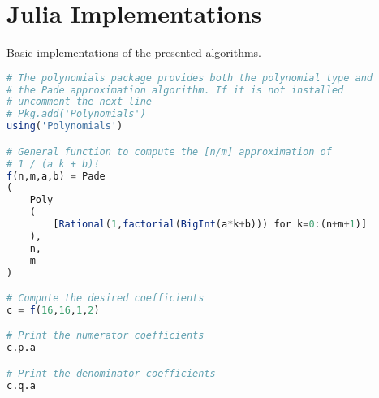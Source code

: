 \chapter{Julia Implementations}
Basic implementations of the presented algorithms.

\begin{lstlisting}[language=Julia,caption=Poor man's symbolic computation of the Pade coefficients of the generalized hyperbolic functions in Julia]
# The polynomials package provides both the polynomial type and
# the Pade approximation algorithm. If it is not installed 
# uncomment the next line
# Pkg.add('Polynomials')
using('Polynomials')

# General function to compute the [n/m] approximation of
# 1 / (a k + b)!
f(n,m,a,b) = Pade
(
	Poly
	(
		[Rational(1,factorial(BigInt(a*k+b))) for k=0:(n+m+1)]
	),
	n,
	m
)

# Compute the desired coefficients
c = f(16,16,1,2)

# Print the numerator coefficients
c.p.a

# Print the denominator coefficients
c.q.a
\end{lstlisting}
